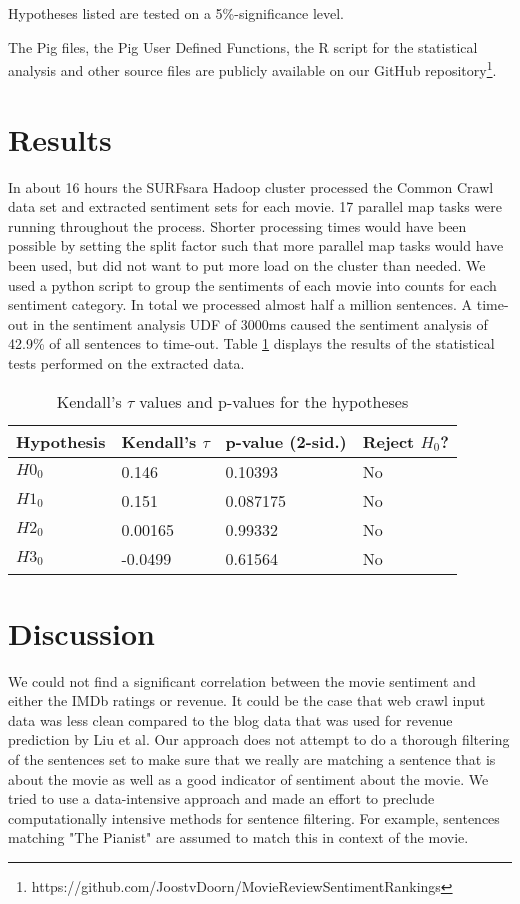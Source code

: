 \documentclass{sig-alternate-br}
\begin{document}
Hypotheses listed are tested on a 5\%-significance level.

The Pig files, the Pig User Defined Functions, the R script for the statistical analysis and other source files are publicly available on our GitHub repository\footnote{https://github.com/JoostvDoorn/MovieReviewSentimentRankings}.

\section{Results}
In about 16 hours the SURFsara Hadoop cluster processed the Common Crawl data set and extracted sentiment sets for each movie. 17 parallel map tasks were running throughout the process. Shorter processing times would have been possible by setting the split factor such that more parallel map tasks would have been used, but did not want to put more load on the cluster than needed. We used a python script to group the sentiments of each movie into counts for each sentiment category. In total we processed almost half a million sentences. A time-out in the sentiment analysis UDF of 3000ms caused the sentiment analysis of 42.9\% of all sentences to time-out. Table \ref{tab:hypothesis_tests} displays the results of the statistical tests performed on the extracted data.
\begin{table}[!h!p]
\begin{tabular}{l|lll}
Hypothesis & Kendall's $\tau$ & p-value (2-sid.) & Reject $H_0$?\\
\hline
$H0_0$ & 0.146 & 0.10393 & No \\ 
$H1_0$ & 0.151 & 0.087175 & No \\ 
$H2_0$ & 0.00165 & 0.99332 & No \\ 
$H3_0$ & -0.0499 & 0.61564 & No\\ 
\end{tabular}
\caption{Kendall's $\tau$ values and p-values for the hypotheses}
\label{tab:hypothesis_tests}
\end{table}

\section{Discussion}
We could not find a significant correlation between the movie sentiment and either the IMDb ratings or revenue. It could be the case that web crawl input data was less clean compared to the blog data that was used for revenue prediction by Liu et al\cite{Liu2007}. Our approach does not attempt to do a thorough filtering of the sentences set to make sure that we really are matching a sentence that is about the movie as well as a good indicator of sentiment about the movie. We tried to use a data-intensive approach and made an effort to preclude computationally intensive methods for sentence filtering. For example, sentences matching "The Pianist" are assumed to match this in context of the movie. 
\end{document}
